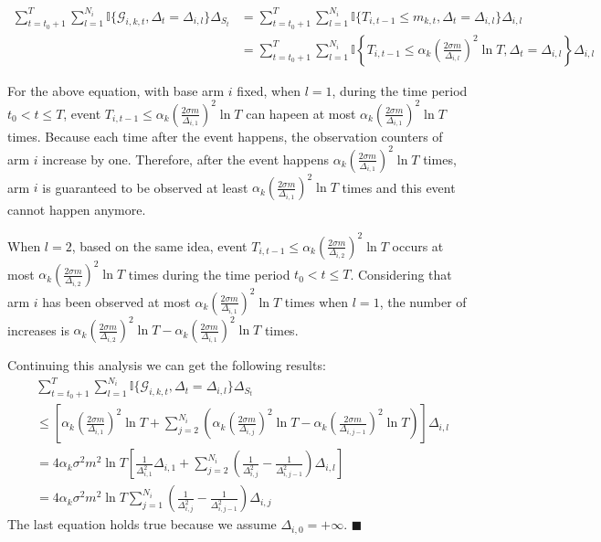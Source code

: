 \documentclass[opre,sglanonrev]{informs4}
\begin{document}
$$\begin{aligned}
    \sum_{t=t_0+1}^T\sum_{l=1}^{N_i}\mathbb{I}\{\mathcal{G}_{i,k,t},\Delta_t=\Delta_{i,l}\}\Delta_{S_t}&=\sum_{t=t_0+1}^T\sum_{l=1}^{N_i}\mathbb{I}\{T_{i,t-1}\leq m_{k,t},\Delta_t=\Delta_{i,l}\}\Delta_{i,l}\\
    &=\sum_{t=t_0+1}^T\sum_{l=1}^{N_i}\mathbb{I}\left\{T_{i,t-1}\leq\alpha_k\left(\frac{2\sigma m}{\Delta_{i,l}}\right)^2\ln T,\Delta_t=\Delta_{i,l}\right\}\Delta_{i,l}
\end{aligned}$$

For the above equation, with base arm $i$ fixed, when $l = 1$, during the time period $t_0<t\leq T$, event $T_{i,t-1}\leq\alpha_k\left(\frac{2\sigma m}{\Delta_{i,1}}\right)^2\ln T$ can hapeen at most $\alpha_k\left(\frac{2\sigma m}{\Delta_{i,1}}\right)^2\ln T$ times. Because each time after the event happens, the observation counters of arm $i$ increase by one. Therefore, after the event happens $\alpha_k\left(\frac{2\sigma m}{\Delta_{i,1}}\right)^2\ln T$ times, arm $i$ is guaranteed to be observed at least $\alpha_k\left(\frac{2\sigma m}{\Delta_{i,1}}\right)^2\ln T$ times and this event cannot happen anymore.

When $l = 2$, based on the same idea, event $T_{i,t-1}\leq\alpha_k\left(\frac{2\sigma m}{\Delta_{i,2}}\right)^2\ln T$ occurs at most $\alpha_k\left(\frac{2\sigma m}{\Delta_{i,2}}\right)^2\ln T$ times during the time period $t_0<t\leq T$. Considering that arm $i$ has been observed at most $\alpha_k\left(\frac{2\sigma m}{\Delta_{i,1}}\right)^2\ln T$ times when $l=1$, the number of increases is $\alpha_k\left(\frac{2\sigma m}{\Delta_{i,2}}\right)^2\ln T - \alpha_k\left(\frac{2\sigma m}{\Delta_{i,1}}\right)^2\ln T$ times.

Continuing this analysis we can get the following results:
$$\begin{aligned}
    &\sum_{t=t_0+1}^T\sum_{l=1}^{N_i}\mathbb{I}\{\mathcal{G}_{i,k,t},\Delta_t=\Delta_{i,l}\}\Delta_{S_t}\\
    &\leq \left[\alpha_k\left(\frac{2\sigma m}{\Delta_{i,1}}\right)^2\ln T + \sum_{j=2}^{N_i} \left(\alpha_k\left(\frac{2\sigma m}{\Delta_{i,j}}\right)^2\ln T - \alpha_k\left(\frac{2\sigma m}{\Delta_{i,j-1}}\right)^2\ln T\right)\right]\Delta_{i,l}\\
    &=4\alpha_k \sigma^2 m^2\ln T\left[\frac{1}{\Delta_{i,1}^2}\Delta_{i,1} + \sum_{j=2}^{N_i}\left(\frac{1}{\Delta_{i,j}^2}-\frac{1}{\Delta_{i,j-1}^2}\right)\Delta_{i,l}\right]\\
    &=4\alpha_k \sigma^2 m^2\ln T\sum_{j=1}^{N_i}\left(\frac{1}{\Delta_{i,j}^2}-\frac{1}{\Delta_{i,j-1}^2}\right)\Delta_{i,j}
\end{aligned}$$
The last equation holds true because we assume $\Delta_{i,0}=+\infty$.
\hfill $\blacksquare$
\end{document}
